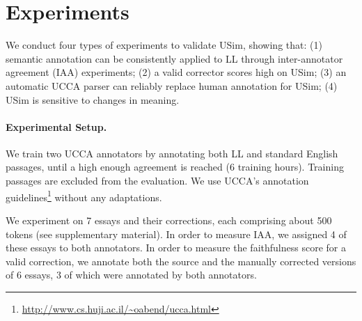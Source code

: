 \documentclass[a4paper, 11pt]{article}
\begin{document}
%
%
%

\section{Experiments}


We conduct four types of experiments to validate {\sc USim}, showing that:
(1) semantic annotation can be consistently applied to LL through inter-annotator agreement (IAA) experiments;
(2) a valid corrector scores high on {\sc USim};
(3) an automatic UCCA parser can reliably replace human annotation for {\sc USim};
(4) {\sc USim} is sensitive to changes in meaning.

\paragraph{Experimental Setup.}
We train two UCCA annotators by annotating both LL and standard English
passages, until a high enough agreement is reached (6 training hours).
Training passages are excluded from the evaluation.
We use UCCA's annotation
guidelines\footnote{\url{http://www.cs.huji.ac.il/~oabend/ucca.html}}
without any adaptations.

We experiment on 7 essays and their corrections, each comprising about 500 tokens (see supplementary material).
In order to measure IAA, we assigned 4 of these essays to both annotators.
In order to measure the faithfulness score for a valid correction,
we annotate both the source
and the manually corrected versions of 6 essays,
3 of which were annotated by both annotators.
\end{document}
